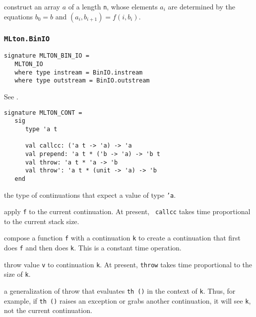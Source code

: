 \begin{description}

construct an array $a$ of a length {\tt n}, whose elements $a_i$ are determined
by the equations $b_0 = b$ and $(a_i, b_{i+1}) = f (i, b_i)$.

\end{description}

\subsubsection{{\tt MLton.BinIO}}
\begin{verbatim}
signature MLTON_BIN_IO =
   MLTON_IO
   where type instream = BinIO.instream
   where type outstream = BinIO.outstream
\end{verbatim}

See .


\begin{verbatim}
signature MLTON_CONT =
   sig
      type 'a t

      val callcc: ('a t -> 'a) -> 'a
      val prepend: 'a t * ('b -> 'a) -> 'b t
      val throw: 'a t * 'a -> 'b
      val throw': 'a t * (unit -> 'a) -> 'b
   end
\end{verbatim}

\begin{description}

the type of continuations that expect a value of type {\tt 'a}.

apply {\tt f} to the current continuation.  At present, {\tt
callcc} takes time proportional to the current stack size.

compose a function {\tt f} with a continuation {\tt k} to create a
continuation that first does {\tt f} and then does {\tt k}.  This
is a constant time operation.

throw value {\tt v} to continuation {\tt k}.  At present, {\tt throw}
takes time proportional to the size of {\tt k}.

a generalization of throw that evaluates {\tt th ()} in the context
of {\tt k}.  Thus, for example, if {\tt th ()} raises an exception or
grabs another continuation, it will see {\tt k}, not the current
continuation.

\end{description}

